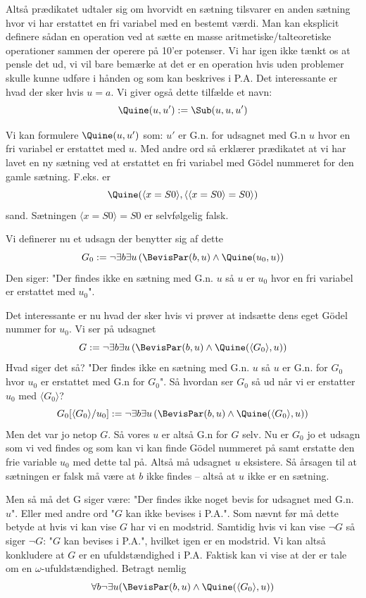 Altså prædikatet udtaler sig om hvorvidt en sætning tilsvarer en anden sætning hvor vi har erstattet en fri variabel med en bestemt værdi.
Man kan eksplicit definere sådan en operation ved at sætte en masse aritmetiske/talteoretiske operationer sammen der operere på 10'er potenser.
Vi har igen ikke tænkt os at pensle det ud, vi vil bare bemærke at det er en operation hvis uden problemer skulle kunne udføre
i hånden og som kan beskrives i P.A. Det interessante er hvad der sker hvis $u=a$.
Vi giver også dette tilfælde et navn:
\[
	\Quine(u,u') := \Sub(u,u,u')
\]

Vi kan formulere $\Quine(u,u')$ som: $u'$ er G.n. for udsagnet med G.n $u$ hvor en fri variabel er erstattet med $u$. Med andre ord så erklærer prædikatet at vi har lavet en ny sætning ved at erstattet en fri variabel med Gödel nummeret for den gamle sætning. F.eks. er
\[
	\Quine(\langle x=S0 \rangle, \langle\langle x=S0\rangle=S0\rangle)
\]
sand. Sætningen $\langle x=S0 \rangle = S0$ er selvfølgelig falsk.

Vi definerer nu et udsagn der benytter sig af dette
\[
	G_0 := \neg\exists b \exists u \left( \BevisPar(b,u) \land \Quine(u_0,u) \right)
\]
Den siger: "Der findes ikke en sætning med G.n. $u$ så $u$ er $u_0$ hvor en fri variabel er erstattet med $u_0$".

Det interessante er nu hvad der sker hvis vi prøver at indsætte dens eget Gödel nummer for $u_0$.
Vi ser på udsagnet
\[
	G := \neg\exists b \exists u \left( \BevisPar(b,u) \land \Quine(\langle G_0 \rangle,u) \right)
\]
Hvad siger det så? "Der findes ikke en sætning med G.n. $u$ så $u$ er G.n. for $G_0$ hvor
$u_0$ er erstattet med G.n for $G_0$". Så hvordan ser $G_0$ så ud når vi er erstatter $u_0$ med $\langle G_0 \rangle$?
\[
	G_0[\langle G_0 \rangle/u_0] := \neg\exists b \exists u \left( \BevisPar(b,u) \land \Quine(\langle G_0 \rangle,u) \right)
\]
Men det var jo netop $G$. Så vores $u$ er altså G.n for $G$ selv. Nu er $G_0$ jo et udsagn som vi ved findes og som kan
vi kan finde Gödel nummeret på samt erstatte den frie variable $u_0$ med dette tal på.
Altså må udsagnet $u$ eksistere. Så årsagen til at sætningen er falsk må være at $b$ ikke findes -- altså at $u$ ikke er en sætning.

Men så må det G siger være: "Der findes ikke noget bevis for udsagnet med G.n. $u$".
Eller med andre ord "$G$ kan ikke bevises i P.A.". Som nævnt før må dette betyde at hvis vi kan vise $G$ har vi en modstrid.
Samtidig hvis vi kan vise $\neg G$ så siger $\neg G$: "$G$ kan bevises i P.A.", hvilket igen er en modstrid.
Vi kan altså konkludere at $G$ er en ufuldstændighed i P.A. Faktisk kan vi vise at der er tale om en $\omega$-ufuldstændighed.
Betragt nemlig
\[
	\forall b \neg \exists u (\BevisPar(b,u) \land \Quine(\langle G_0 \rangle, u))
\]

